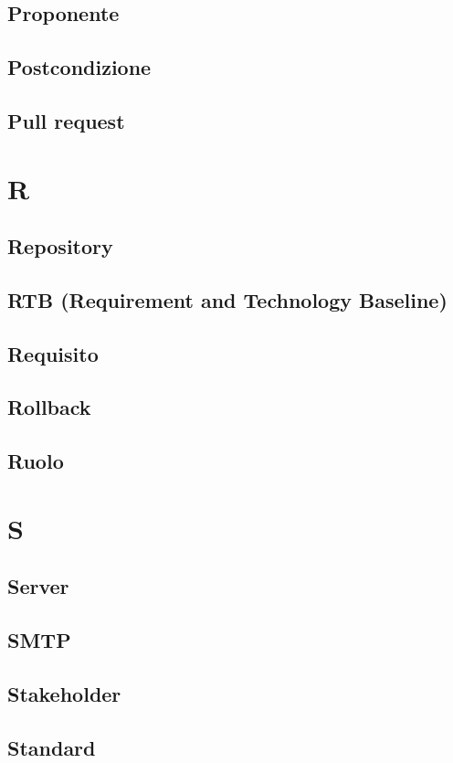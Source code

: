 \documentclass[12pt]{article}
\begin{document}
		\subsection{Proponente}
		\subsection{Postcondizione}
		\subsection{Pull request}
	\clearpage
	\section{R}
		\subsection{Repository}
		\subsection{RTB (Requirement and Technology Baseline)}
		\subsection{Requisito}
		\subsection{Rollback}
		\subsection{Ruolo}
	\clearpage
	\section{S}
		\subsection{Server}
		\subsection{SMTP}
		\subsection{Stakeholder}
		\subsection{Standard}
\end{document}
